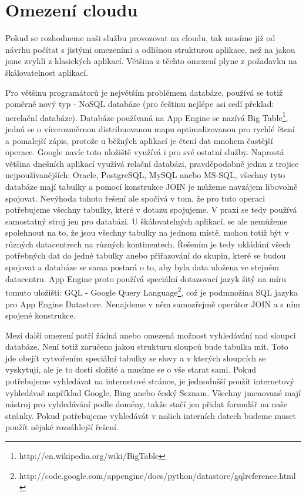 \section{Omezení cloudu}
Pokud se rozhodneme naši službu provozovat na cloudu, tak musíme již od návrhu počítat s jistými omezeními a odlišnou strukturou aplikace, než na jakou jsme zvyklí z klasických aplikací. Většina z těchto omezení plyne z požadavku na škálovatelnost aplikací.

Pro většinu programátorů je největším problémem databáze, používá se totiž poměrně nový typ - NoSQL databáze (pro češtinu nejlépe asi sedí překlad: nerelační databáze). Databáze používaná na App Engine se nazívá Big Table\footnote{http://en.wikipedia.org/wiki/BigTable}, jedná se o vícerozměrnou distribuovanou mapu optimalizovanou pro rychlé čtení a pomalejší zápis, protože u běžných aplikací je čtení dat mnohem častější operace. Google navíc toto uložiště využívá i pro své ostatní služby. Naprostá většina dnešních aplikací využívá relační databázi, pravděpodobně jednu z trojice nejpoužívanějších: Oracle, PostgreSQL, MySQL anebo MS-SQL, všechny tyto databáze mají tabulky a pomocí konstrukce JOIN je můžeme navzájem libovolně spojovat. Nevýhoda tohoto řešení ale spočívá v tom, že pro tuto operaci potřebujeme všechny tabulky, které v dotazu spojujeme. V praxi se tedy používá samostatný stroj jen pro databázi. U škálovatelných aplikací, se ale nemůžeme spolehnout na to, že jsou všechny tabulky na jednom místě, mohou totiž být v různých datacentrech na různých kontinentech. Řešením je tedy ukládání všech potřebných dat do jedné tabulky anebo přiřazování do skupin, které se budou spojovat a databáze se sama postará o to, aby byla data uložena ve stejném datacentru. %
App Engine proto používá speciální dotazovací jazyk šitý na míru tomuto uložišti: GQL - Google Query Language\footnote{http://code.google.com/appengine/docs/python/datastore/gqlreference.html},
což je podmnožina SQL jazyka pro App Engine Datastore. Nenajdeme v něm samozřejmě operátor JOIN a s ním spojené konstrukce.

Mezi další omezení patří žádná anebo omezená možnost vyhledávání nad sloupci databáze. Není totiž zaručeno jakou strukturu sloupců bude tabulka mít. Toto jde obejít vytvořením speciální tabulky se slovy a v kterých sloupcích se vyskytují, ale je to dosti složité a musíme se o vše starat sami. Pokud potřebujeme vyhledávat na internetové stránce, je jednodušší použít internetový vyhledávač například Google, Bing anebo český Seznam. Všechny jmenované mají nástroj pro vyhledávání podle domény, takže stačí jen přidat formulář na naše stránky. Pokud potřebujeme vyhledávát v našich interních datech budeme muset použít nějaké rozsáhlejší řešení.

